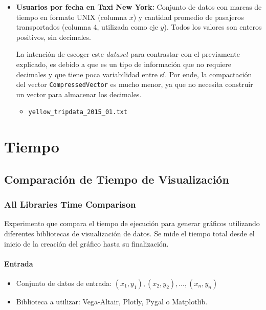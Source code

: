 \begin{itemize}
    \item \textbf{Usuarios por fecha en Taxi New York:} Conjunto de datos con marcas de tiempo en formato UNIX (columna \(x\)) y cantidad promedio de pasajeros transportados (columna 4, utilizada como eje \(y\)). Todos los valores son enteros positivos, sin decimales.\cite{kaggle_taxi}

    La intención de escoger este \textit{dataset} para contrastar con el previamente explicado, es debido a que es un tipo de información que no requiere decimales y que tiene poca variabilidad entre sí. Por ende, la compactación del vector \texttt{CompressedVector} es mucho menor, ya que no necesita construir un vector para almacenar los decimales.
    
    \label{input_taxi}
        \begin{itemize}
            \item \texttt{yellow\_tripdata\_2015\_01.txt}
        \end{itemize}
\end{itemize}


\newpage
\section{Tiempo}

\subsection{Comparación de Tiempo de Visualización}

\setcounter{secnumdepth}{3}
\setcounter{tocdepth}{3}
\subsubsection{All Libraries Time Comparison}
\label{all_libraries_time_comparison}

Experimento que compara el tiempo de ejecución para generar gráficos utilizando diferentes bibliotecas de visualización de datos. Se mide el tiempo total desde el inicio de la creación del gráfico hasta su finalización.

\paragraph{Entrada}
\begin{itemize}
    \item Conjunto de datos de entrada: \( (x_1, y_1), (x_2, y_2), \ldots, (x_n, y_n) \)
    \item Biblioteca a utilizar: Vega-Altair, Plotly, Pygal o Matplotlib.
\end{itemize}

